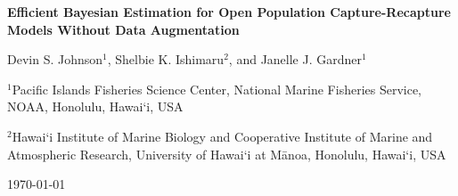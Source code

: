 \documentclass[11pt]{article}
\begin{document}
\setlength{\parindent}{0pt}
\renewcommand{\baselinestretch}{1.8}\normalsize


{\Large \bf Efficient Bayesian Estimation for Open Population Capture-Recapture Models Without Data Augmentation} 

\bigskip\bigskip


{Devin S. Johnson$^1$, Shelbie K. Ishimaru$^2$, and Janelle J. Gardner$^1$} \bigskip

$^1$Pacific Islands Fisheries Science Center, National Marine Fisheries Service, NOAA, Honolulu, Hawai`i, USA \bigskip
 
$^2$Hawai`i Institute of Marine Biology and Cooperative Institute of Marine and Atmospheric Research, University of Hawai`i at Mānoa, Honolulu, Hawai`i, USA \bigskip

\today

\bigskip\bigskip

%


\linenumbers

\end{document}
